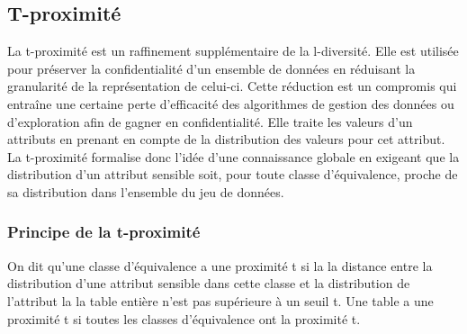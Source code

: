 \subsection{T-proximité}
La t-proximité est un raffinement supplémentaire de la l-diversité. Elle est utilisée pour préserver la confidentialité d'un ensemble de données en réduisant la granularité de la représentation de celui-ci. Cette réduction est un compromis qui entraîne une certaine perte d'efficacité des algorithmes de gestion des données ou d'exploration afin de gagner en confidentialité. Elle traite les valeurs d'un attributs en prenant en compte de la distribution des valeurs pour cet attribut.
La t-proximité formalise donc l’idée d'une connaissance globale en exigeant que la distribution d’un attribut sensible soit, pour toute classe d'équivalence, proche de sa distribution dans l’ensemble du jeu de données. 
\subsubsection{Principe de la t-proximité}
On dit qu'une classe d'équivalence a une proximité t si la la distance entre la distribution d'une attribut sensible dans cette classe et la distribution de l'attribut la la table entière n'est pas supérieure à un seuil t. Une table a une proximité t si toutes les classes d'équivalence ont la proximité t.